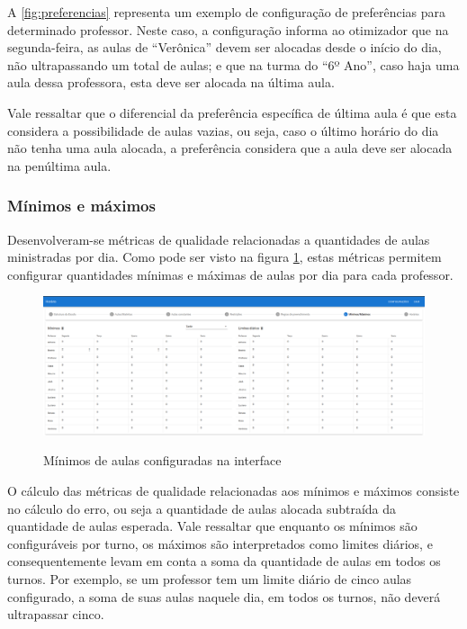 A \autoref{fig:preferencias} representa um exemplo de configuração de preferências para determinado professor. Neste caso, a configuração informa ao otimizador que na segunda-feira, as aulas de ``Verônica'' devem ser alocadas desde o início do dia, não ultrapassando um total de aulas; e que na turma do ``6º Ano'', caso haja uma aula dessa professora, esta deve ser alocada na última aula.

Vale ressaltar que o diferencial da preferência específica de última aula é que esta considera a possibilidade de aulas vazias, ou seja, caso o último horário do dia não tenha uma aula alocada, a preferência considera que a aula deve ser alocada na penúltima aula.

\subsubsection{Mínimos e máximos}

Desenvolveram-se métricas de qualidade relacionadas a quantidades de aulas ministradas por dia. Como pode ser visto na figura \ref{fig:tela_minimos}, estas métricas permitem configurar quantidades mínimas e máximas de aulas por dia para cada professor.

\begin{figure}[htb!]
	\centering
	\caption{Mínimos de aulas configuradas na interface}
	\includegraphics[width=1\textwidth]{./dados/figuras/minimos_configurados}
	\label{fig:tela_minimos}
\end{figure}

O cálculo das métricas de qualidade relacionadas aos mínimos e máximos consiste no cálculo do erro, ou seja a quantidade de aulas alocada subtraída da quantidade de aulas esperada. Vale ressaltar que enquanto os mínimos são configuráveis por turno, os máximos são interpretados como limites diários, e consequentemente levam em conta a soma da quantidade de aulas em todos os turnos. Por exemplo, se um professor tem um limite diário de cinco aulas configurado, a soma de suas aulas naquele dia, em todos os turnos, não deverá ultrapassar cinco.

